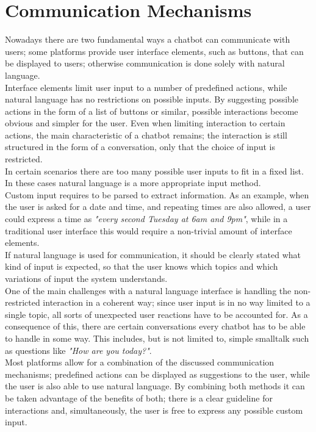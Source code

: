 \section{Communication Mechanisms}
\label{communication}


Nowadays there are two fundamental ways a chatbot can communicate with users;
some platforms provide user interface elements, such as buttons, that can be displayed to users;
otherwise communication is done solely with natural language.
\\

Interface elements limit user input to a number of predefined actions,
while natural language has no restrictions on possible inputs.
By suggesting possible actions in the form of a list of buttons or similar,
possible interactions become obvious and simpler for the user.
Even when limiting interaction to certain actions,
the main characteristic of a chatbot remains;
the interaction is still structured in the form of a conversation,
only that the choice of input is restricted.
\\

In certain scenarios there are too many possible user inputs to fit in a fixed list.
In these cases natural language is a more appropriate input method.
\\
Custom input requires to be parsed to extract information.
As an example, when the user is asked for a date and time, and repeating times are also allowed,
a user could express a time as \emph{"every second Tuesday at 6am and 9pm"},
while in a traditional user interface this would require a non-trivial amount of interface elements.
\\

If natural language is used for communication,
it should be clearly stated what kind of input is expected,
so that the user knows which topics and which variations of input the system understands.
\\

One of the main challenges with a natural language interface is handling the non-restricted interaction
in a coherent way;
since user input is in no way limited to a single topic,
all sorts of unexpected user reactions have to be accounted for.
As a consequence of this, there are certain conversations every chatbot has to be able to handle in some way.
This includes, but is not limited to, simple smalltalk such as questions like \emph{"How are you today?"}.
\\

Most platforms allow for a combination of the discussed communication mechanisms;
predefined actions can be displayed as suggestions to the user,
while the user is also able to use natural language.
By combining both methods it can be taken advantage of the benefits of both;
there is a clear guideline for interactions and, simultaneously,
the user is free to express any possible custom input.
